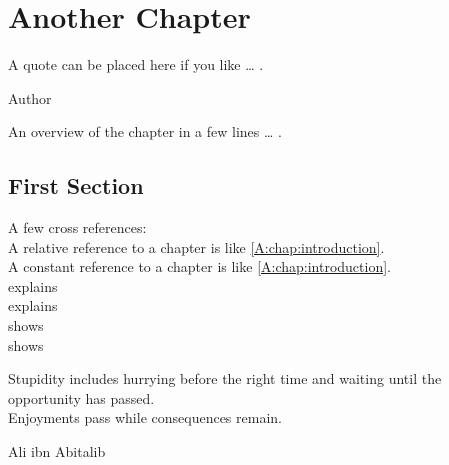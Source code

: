 \chapter{Another Chapter} 
\label{chap:yourlabel}
\epigraph{\epifont\SingleSpacing
A quote can be placed here if you like \ldots{} .\\[1em]
}{Author}

\begin{chapteroverview}  
An overview of the chapter in a few lines \ldots{} .
\end{chapteroverview}

\section{First Section} 
\label{sec:mems} 

A few cross references:\\
A relative reference to a chapter is like \vref{A:chap:introduction}.\\
A constant reference to a chapter is like \cref{A:chap:introduction}.\\
 explains \\
 explains\\
 shows \\
 shows \\

\par\vspace*{\fill}
\epigraph{\epifont\SingleSpacing
Stupidity includes hurrying before the right time and waiting until the 
opportunity has passed.\\[1em]
Enjoyments pass while consequences remain.
}{Ali ibn Abitalib}\newpage